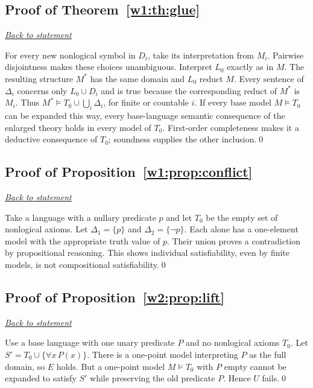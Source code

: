 \documentclass[11pt,letterpaper]{article}
\theoremstyle{definition}\newtheorem{definition}[theorem]{Definition}\newtheorem{example}[theorem]{Example}
\theoremstyle{remark}\newtheorem{remark}[theorem]{Remark}
\newcommand{\backlink}[1]{\noindent\hyperref[#1]{\textit{Back to statement}}\par\smallskip}
\begin{document}
\subsection{Proof of Theorem~\ref{w1:th:glue}}\label{w1:pr:glue}\backlink{w1:th:glue}
For every new nonlogical symbol in $D_i$, take its interpretation from $M_i$. Pairwise disjointness makes these choices unambiguous. Interpret $L_0$ exactly as in $M$. The resulting structure $M^*$ has the same domain and $L_0$ reduct $M$. Every sentence of $\Delta_i$ concerns only $L_0\cup D_i$ and is true because the corresponding reduct of $M^*$ is $M_i$. Thus $M^*\models T_0\cup\bigcup_i\Delta_i$, for finite or countable $i$. If every base model $M\models T_0$ can be expanded this way, every base-language semantic consequence of the enlarged theory holds in every model of $T_0$. First-order completeness makes it a deductive consequence of $T_0$; soundness supplies the other inclusion.\qed


\subsection{Proof of Proposition~\ref{w1:prop:conflict}}\label{w1:pr:conflict}\backlink{w1:prop:conflict}
Take a language with a nullary predicate $p$ and let $T_0$ be the empty set of nonlogical axioms. Let $\Delta_1=\{p\}$ and $\Delta_2=\{\neg p\}$. Each alone has a one-element model with the appropriate truth value of $p$. Their union proves a contradiction by propositional reasoning. This shows individual satisfiability, even by finite models, is not compositional satisfiability.\qed


\subsection{Proof of Proposition~\ref{w2:prop:lift}}\label{w2:pr:lift}\backlink{w2:prop:lift}
Use a base language with one unary predicate $P$ and no nonlogical axioms $T_0$. Let $S'=T_0\cup\{\forall x\,P(x)\}$. There is a one-point model interpreting $P$ as the full domain, so $E$ holds. But a one-point model $M\models T_0$ with $P$ empty cannot be expanded to satisfy $S'$ while preserving the old predicate $P$. Hence $U$ fails.\qed
\end{document}

